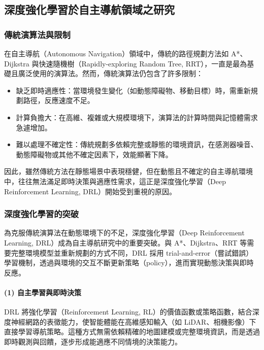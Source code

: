 \documentclass[12pt,a4paper]{article}
\begin{document}
\subsection{深度強化學習於自主導航領域之研究}

\subsubsection{傳統演算法與限制}
在自主導航（Autonomous Navigation）領域中，傳統的路徑規劃方法如 A*、Dijkstra 與快速隨機樹（Rapidly-exploring Random Tree, RRT），一直是最為基礎且廣泛使用的演算法。然而，傳統演算法仍包含了許多限制\cite{PathPlanning}：
\begin{itemize}
  \item 缺乏即時適應性：當環境發生變化（如動態障礙物、移動目標）時，需重新規劃路徑，反應速度不足\cite{EnhancedPathPlanning}。
  \item 計算負擔大：在高維、複雜或大規模環境下，演算法的計算時間與記憶體需求急遽增加\cite{SimulationHeuristic}。
  \item 難以處理不確定性：傳統規劃多依賴完整或靜態的環境資訊\cite{EnhancingPathPlanning}，在感測器噪音、動態障礙物或其他不確定因素下，效能顯著下降。
\end{itemize}

因此，雖然傳統方法在靜態場景中表現穩健，但在動態且不確定的自主導航環境中，往往無法滿足即時決策與適應性需求，這正是深度強化學習（Deep Reinforcement Learning, DRL）開始受到重視的原因。


\subsubsection{深度強化學習的突破}
為克服傳統演算法在動態環境下的不足，深度強化學習（Deep Reinforcement Learning, DRL）成為自主導航研究中的重要突破。與 A*、Dijkstra、RRT 等需要完整環境模型並重新規劃的方式不同，DRL 採用 trial-and-error（嘗試錯誤）學習機制，透過與環境的交互不斷更新策略（policy），進而實現動態決策與即時反應\cite{DRL2018}。

\paragraph{(1) 自主學習與即時決策}
DRL 將強化學習（Reinforcement Learning, RL）的價值函數或策略函數，結合深度神經網路的表徵能力，使智能體能在高維感知輸入（如 LiDAR、相機影像）下直接學習導航策略。這種方式無需依賴精確的地圖建模或完整環境資訊，而是透過即時觀測與回饋，逐步形成能適應不同情境的決策能力\cite{DRLAutonomous}\cite{DRLBased}。
\end{document}
